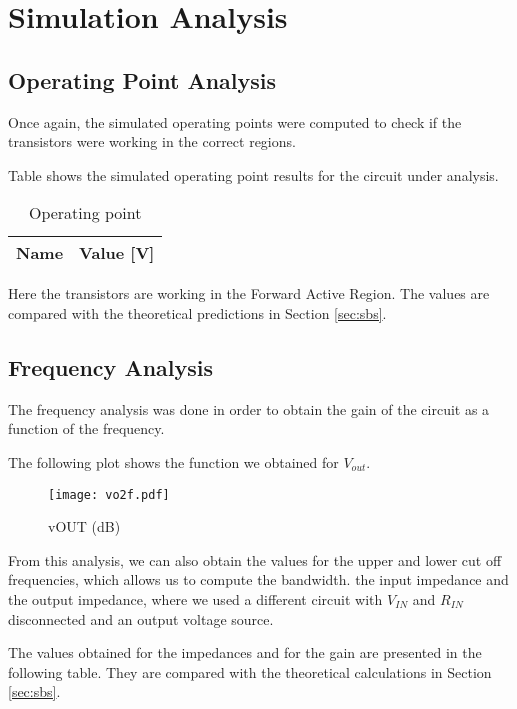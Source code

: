 \section{Simulation Analysis}
\label{sec:simulation}

\subsection{Operating Point Analysis}

Once again, the simulated operating points were computed to check if the transistors were working in the correct regions. \par
Table  shows the simulated operating point results for the circuit
under analysis.

\begin{table}[h]
  \centering
  \begin{tabular}{|l|r|}
    \hline    
    {\bf Name} & {\bf Value [V]} \\ \hline
    
  \end{tabular}
  \caption{Operating point}
  \label{tab:OP_sim}
\end{table}
\FloatBarrier

Here the transistors are working in the Forward Active Region. The values are compared with the theoretical predictions in Section \ref{sec:sbs}.


\subsection{Frequency Analysis}
The frequency analysis was done in order to obtain the gain of the circuit as a function of the frequency. \par
The following plot shows the function we obtained for $V_{out}$.

\begin{figure}[h] \centering
\texttt{[image: vo2f.pdf]}
\caption{vOUT (dB)}
\label{fig:vOUT}
\end{figure}
\FloatBarrier

From this analysis, we can also obtain the values for the upper and lower cut off frequencies, which allows us to compute the bandwidth. the input impedance and the output impedance, where we used a different circuit with $V_{IN}$ and $R_{IN}$ disconnected and an output voltage source. \par
The values obtained for the impedances and for the gain are presented in the following table. They are compared with the theoretical calculations in Section \ref{sec:sbs}.

